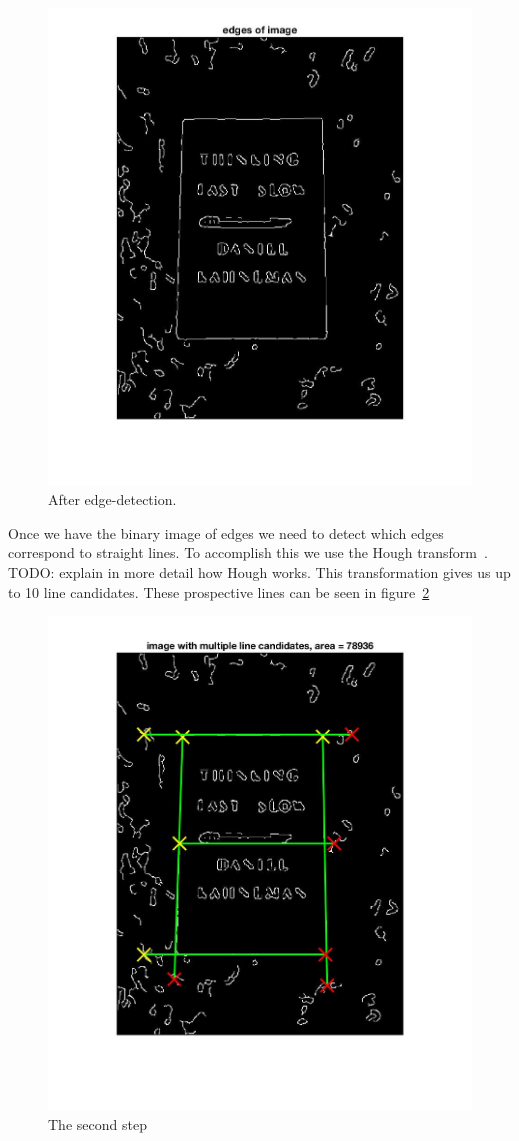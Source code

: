 \begin{figure}[t]
\begin{center}
   \includegraphics[width=0.8\linewidth]{figures/edgeDetection.jpg}
\end{center}
\caption{After edge-detection.}
\label{fig:edge}
\end{figure}

Once we have the binary image of edges we need to detect which edges correspond to straight lines.
To accomplish this we use the Hough transform~\cite{hough}.
TODO: explain in more detail how Hough works.
This transformation gives us up to 10 line candidates.
These prospective lines can be seen in figure~\ref{fig:lines}

\begin{figure}[t]
\begin{center}
   \includegraphics[width=0.8\linewidth]{figures/step2.jpg}
\end{center}
\caption{The second step}
\label{fig:lines}
\end{figure}

